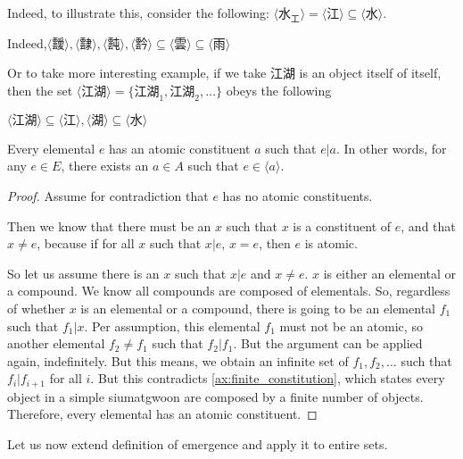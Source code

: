 Indeed, to illustrate this, consider the following:
$\langle \text{水}_\text{工} \rangle = \langle \text{江} \rangle \subseteq
\langle \text{水} \rangle$. 

Indeed,$\langle \text{靉} \rangle, \langle \text{霴} \rangle, \langle \text{霕} \rangle, \langle \text{霒} \rangle \subseteq \langle \text{雲} \rangle \subseteq \langle \text{雨} \rangle$

Or to take more interesting example, if we take $\text{江湖}$ is an object itself of itself, then the set $\langle \text{江湖} \rangle = \{\text{江湖}_{1}, \text{江湖}_{2}, \ldots\}$ obeys the following 

$\langle \text{江湖} \rangle \subseteq \langle \text{江} \rangle,  \langle \text{湖} \rangle \subseteq \langle \text{水} \rangle$

\begin{lemma}\label{lem:every-elemental-has-an-atomic-constituent}
    Every elemental $e$ has an atomic constituent $a$ such that $e|a$. In other words, for any $e \in E$, there exists an $a \in A$ such that $e \in \langle a \rangle$.
\end{lemma}
\begin{proof}
    Assume for contradiction that $e$ has no atomic constituents. 

    Then we know that there must be an $x$ such that $x$ is a constituent of $e$, and that $x\neq e$, because if for all $x$ such that $x|e$, $x=e$, then $e$ is atomic. 

    So let us assume there is an $x$ such that $x|e$ and $x\neq e$. $x$ is either an elemental or a compound. We know all compounds are composed of elementals. So, regardless of whether $x$ is an elemental or a compound, there is going to be an elemental $f_1$ such that $f_1|x$. Per assumption, this elemental $f_1$ must not be an atomic, so another elemental $f_2\neq f_1$ such that $f_2|f_1$. But the argument can be applied again, indefinitely. But this means, we obtain an infinite set of $f_1, f_2, \ldots$ such that $f_i|f_{i+1}$ for all $i$. But this contradicts \ref{ax:finite_constitution}, which states every object in a simple siumatgwoon are composed by a finite number of objects. Therefore, every elemental has an atomic constituent.
\end{proof}








Let us now extend definition of emergence and apply it to entire sets. 
    
